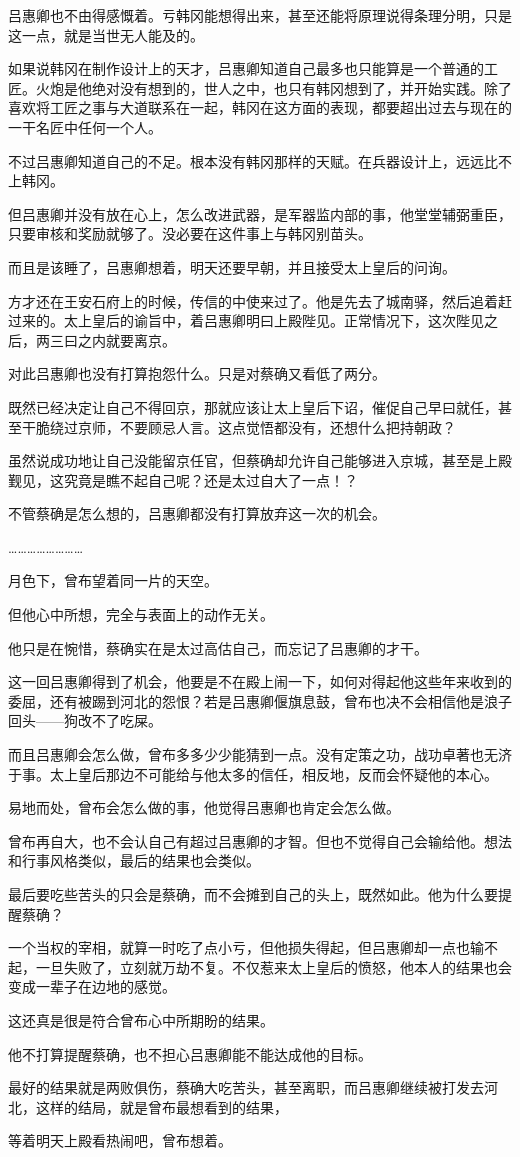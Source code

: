 吕惠卿也不由得感慨着。亏韩冈能想得出来，甚至还能将原理说得条理分明，只是这一点，就是当世无人能及的。

如果说韩冈在制作设计上的天才，吕惠卿知道自己最多也只能算是一个普通的工匠。火炮是他绝对没有想到的，世人之中，也只有韩冈想到了，并开始实践。除了喜欢将工匠之事与大道联系在一起，韩冈在这方面的表现，都要超出过去与现在的一干名匠中任何一个人。

不过吕惠卿知道自己的不足。根本没有韩冈那样的天赋。在兵器设计上，远远比不上韩冈。

但吕惠卿并没有放在心上，怎么改进武器，是军器监内部的事，他堂堂辅弼重臣，只要审核和奖励就够了。没必要在这件事上与韩冈别苗头。

而且是该睡了，吕惠卿想着，明天还要早朝，并且接受太上皇后的问询。

方才还在王安石府上的时候，传信的中使来过了。他是先去了城南驿，然后追着赶过来的。太上皇后的谕旨中，着吕惠卿明曰上殿陛见。正常情况下，这次陛见之后，两三曰之内就要离京。

对此吕惠卿也没有打算抱怨什么。只是对蔡确又看低了两分。

既然已经决定让自己不得回京，那就应该让太上皇后下诏，催促自己早曰就任，甚至干脆绕过京师，不要顾忌人言。这点觉悟都没有，还想什么把持朝政？

虽然说成功地让自己没能留京任官，但蔡确却允许自己能够进入京城，甚至是上殿觐见，这究竟是瞧不起自己呢？还是太过自大了一点！？

不管蔡确是怎么想的，吕惠卿都没有打算放弃这一次的机会。

……………………

月色下，曾布望着同一片的天空。

但他心中所想，完全与表面上的动作无关。

他只是在惋惜，蔡确实在是太过高估自己，而忘记了吕惠卿的才干。

这一回吕惠卿得到了机会，他要是不在殿上闹一下，如何对得起他这些年来收到的委屈，还有被踢到河北的怨恨？若是吕惠卿偃旗息鼓，曾布也决不会相信他是浪子回头——狗改不了吃屎。

而且吕惠卿会怎么做，曾布多多少少能猜到一点。没有定策之功，战功卓著也无济于事。太上皇后那边不可能给与他太多的信任，相反地，反而会怀疑他的本心。

易地而处，曾布会怎么做的事，他觉得吕惠卿也肯定会怎么做。

曾布再自大，也不会认自己有超过吕惠卿的才智。但也不觉得自己会输给他。想法和行事风格类似，最后的结果也会类似。

最后要吃些苦头的只会是蔡确，而不会摊到自己的头上，既然如此。他为什么要提醒蔡确？

一个当权的宰相，就算一时吃了点小亏，但他损失得起，但吕惠卿却一点也输不起，一旦失败了，立刻就万劫不复。不仅惹来太上皇后的愤怒，他本人的结果也会变成一辈子在边地的感觉。

这还真是很是符合曾布心中所期盼的结果。

他不打算提醒蔡确，也不担心吕惠卿能不能达成他的目标。

最好的结果就是两败俱伤，蔡确大吃苦头，甚至离职，而吕惠卿继续被打发去河北，这样的结局，就是曾布最想看到的结果，

等着明天上殿看热闹吧，曾布想着。

